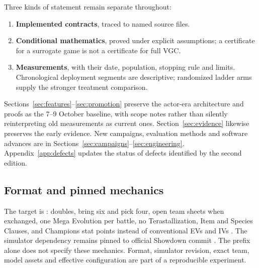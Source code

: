 Three kinds of statement remain separate throughout:
\begin{enumerate}
  \item \textbf{Implemented contracts}, traced to named source files.
  \item \textbf{Conditional mathematics}, proved under explicit assumptions;
    a certificate for a surrogate game is not a certificate for full VGC.
  \item \textbf{Measurements}, with their date, population, stopping rule and
    limits. Chronological deployment segments are descriptive; randomized
    ladder arms supply the stronger treatment comparison.
\end{enumerate}
Sections~\ref{sec:features}--\ref{sec:promotion} preserve the actor-era
architecture and proofs as the 7--9 October baseline, with scope notes rather
than silently reinterpreting old measurements as current ones.
Section~\ref{sec:evidence} likewise preserves the early evidence. New
campaigns, evaluation methods and software advances are in
Sections~\ref{sec:campaigns}--\ref{sec:engineering}. Appendix~\ref{app:defects}
updates the status of defects identified by the second edition.

\subsection{Format and pinned mechanics}
The target is : doubles, bring six and pick
four, open team sheets when exchanged, one Mega Evolution per battle, no
Terastallization, Item and Species Clauses, and Champions stat points instead
of conventional EVs and IVs \citep{championsrules}. The simulator dependency
remains pinned to official Showdown commit
 \citep{showdownsource}.
The  prefix alone does not specify these mechanics. Format,
simulator revision, exact team, model assets and effective configuration are
part of a reproducible experiment.

